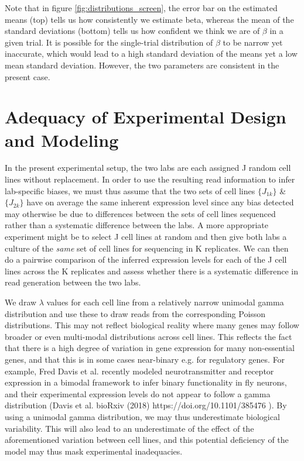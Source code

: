 \documentclass{article}
\begin{document}
Note that in figure \ref{fig:distributions_screen}, the error bar on the estimated means (top) tells us how consistently we estimate beta, whereas the mean of the standard deviations (bottom) tells us how confident we think we are of $\beta$ in a given trial. It is possible for the single-trial distribution of $\beta$ to be narrow yet inaccurate, which would lead to a high standard deviation of the means yet a low mean standard deviation. However, the two parameters are consistent in the present case.

\section{Adequacy of Experimental Design and Modeling}

In the present experimental setup, the two labs are each assigned J random cell lines without replacement. In order to use the resulting read information to infer lab-specific biases, we must thus assume that the two sets of cell lines $\{J_{1k}\}$ \& $\{J_{2k}\}$ have on average the same inherent expression level since any bias detected may otherwise be due to differences between the sets of cell lines sequenced rather than a systematic difference between the labs. A more appropriate experiment might be to select J cell lines at random and then give both labs a culture of the \textit{same} set of cell lines for sequencing in K replicates. We can then do a pairwise comparison of the inferred expression levels for each of the J cell lines across the K replicates and assess whether there is a systematic difference in read generation between the two labs.

We draw $\lambda$ values for each cell line from a relatively narrow unimodal gamma distribution and use these to draw reads from the corresponding Poisson distributions. This may not reflect biological reality where many genes may follow broader or even multi-modal distributions across cell lines. This reflects the fact that there is a high degree of variation in gene expression for many non-essential genes, and that this is in some cases near-binary e.g. for regulatory genes. For example, Fred Davis et al. recently modeled neurotransmitter and receptor expression in a bimodal framework to infer binary functionality in fly neurons, and their experimental expression levels do not appear to follow a gamma distribution (Davis et al. bioRxiv (2018) https://doi.org/10.1101/385476 ). By using a unimodal gamma distribution, we may thus underestimate biological variability. This will also lead to an underestimate of the effect of the aforementioned variation between cell lines, and this potential deficiency of the model may thus mask experimental inadequacies.
\end{document}
